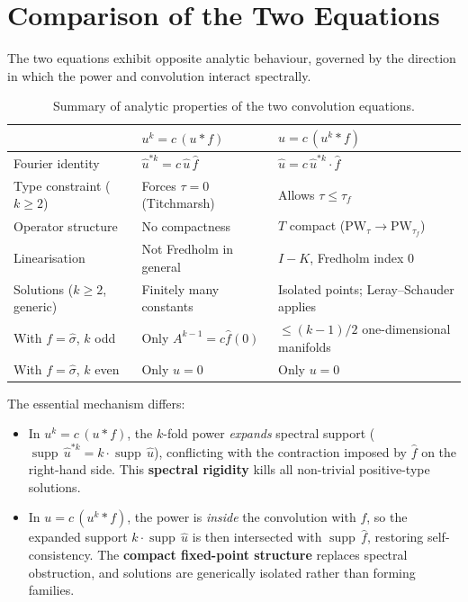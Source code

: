 \documentclass[12pt]{article}
\DeclareMathOperator{\supp}{supp}
\newcommand{\PW}{\mathrm{PW}}
\newcommand{\wh}{\widehat}
\begin{document}
\section{Comparison of the Two Equations}

The two equations exhibit opposite analytic behaviour, governed by the
direction in which the power and convolution interact spectrally.

\renewcommand{\arraystretch}{1.5}
\begin{table}[h]
\centering
\begin{tabular}{lll}
\hline
& $u^k = c\,(u\ast f)$ & $u = c\,(u^k\ast f)$ \\
\hline
Fourier identity & $\wh u^{\ast k} = c\,\wh u\,\wh f$ &
  $\wh u = c\,\wh u^{\ast k}\cdot\wh f$ \\
Type constraint ($k\geq 2$) & Forces $\tau = 0$ (Titchmarsh) &
  Allows $\tau \leq \tau_f$ \\
Operator structure & No compactness & $T$ compact ($\PW_\tau\to\PW_{\tau_f}$) \\
Linearisation & Not Fredholm in general &
  $I - K$, Fredholm index $0$ \\
Solutions ($k\geq 2$, generic) &
  Finitely many constants & Isolated points; Leray--Schauder applies \\
With $f = \wh\sigma$, $k$ odd &
  Only $A^{k-1} = c\wh f(0)$ &
  $\leq (k-1)/2$ one-dimensional manifolds \\
With $f = \wh\sigma$, $k$ even & Only $u = 0$ & Only $u = 0$ \\
\hline
\end{tabular}
\caption{Summary of analytic properties of the two convolution equations.}
\end{table}

The essential mechanism differs:
\begin{itemize}[leftmargin=2em]
  \item In $u^k = c\,(u\ast f)$, the $k$-fold power \emph{expands} spectral
    support ($\supp\,\wh u^{\ast k} = k\cdot\supp\,\wh u$), conflicting with the
    contraction imposed by $\wh f$ on the right-hand side.
    This \textbf{spectral rigidity} kills all non-trivial positive-type solutions.

  \item In $u = c\,(u^k\ast f)$, the power is \emph{inside} the convolution
    with $f$, so the expanded support $k\cdot\supp\,\wh u$ is then
    intersected with $\supp\,\wh f$, restoring self-consistency.
    The \textbf{compact fixed-point structure} replaces spectral obstruction,
    and solutions are generically isolated rather than forming families.
\end{itemize}
\end{document}
